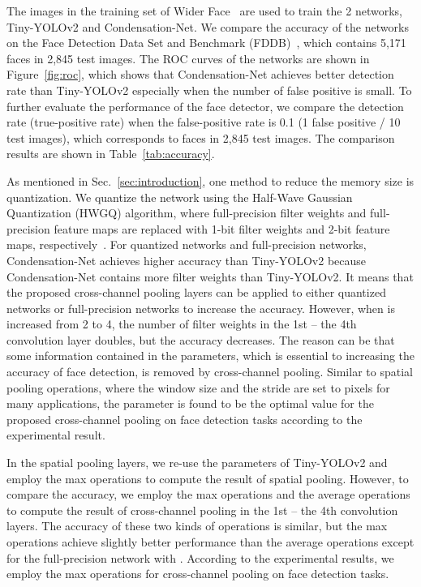 \documentclass[10pt,twocolumn,letterpaper]{article}
\begin{document}
The images in the training set of Wider Face~\cite{Yang16} are used to train the 2 networks, Tiny-YOLOv2 and Condensation-Net. We compare the accuracy of the networks on the Face Detection Data Set and Benchmark (FDDB)~\cite{Jain10}, which contains 5,171 faces in 2,845 test images. The ROC curves of the networks are shown in Figure~\ref{fig:roc}, which shows that Condensation-Net achieves better detection rate than Tiny-YOLOv2 especially when the number of false positive is small. To further evaluate the performance of the face detector, we compare the detection rate (true-positive rate) when the false-positive rate is 0.1 (1 false positive / 10 test images), which corresponds to  faces in 2,845 test images. The comparison results are shown in Table~\ref{tab:accuracy}. 

As mentioned in Sec.~\ref{sec:introduction}, one method to reduce the memory size is quantization. We quantize the network using the Half-Wave Gaussian Quantization (HWGQ) algorithm, where full-precision filter weights and full-precision feature maps are replaced with 1-bit filter weights and 2-bit feature maps, respectively~\cite{Cai17}. For quantized networks and full-precision networks, Condensation-Net achieves higher accuracy than Tiny-YOLOv2 because Condensation-Net contains more filter weights than Tiny-YOLOv2. It means that the proposed cross-channel pooling layers can be applied to either quantized networks or full-precision networks to increase the accuracy. However, when  is increased from 2 to 4, the number of filter weights in the 1st -- the 4th convolution layer doubles, but the accuracy decreases. The reason can be that some information contained in the parameters, which is essential to increasing the accuracy of face detection, is removed by cross-channel pooling. Similar to spatial pooling operations, where the window size and the stride are set to  pixels for many applications, the parameter  is found to be the optimal value for the proposed cross-channel pooling on face detection tasks according to the experimental result.

In the spatial pooling layers, we re-use the parameters of Tiny-YOLOv2 and employ the max operations to compute the result of spatial pooling. However, to compare the accuracy, we employ the max operations and the average operations to compute the result of cross-channel pooling in the 1st -- the 4th convolution layers. The accuracy of these two kinds of operations is similar, but the max operations achieve slightly better performance than the average operations except for the full-precision network with . According to the experimental results, we employ the max operations for cross-channel pooling on face detection tasks.
\end{document}
